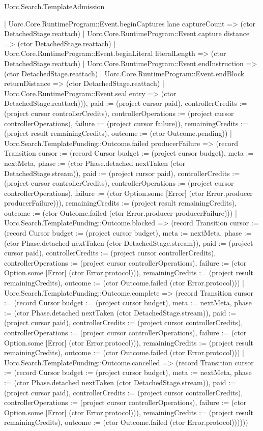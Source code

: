 \begin{lexlean}{Uorc.Search.TemplateAdmission}
\begin{semanticmodule}
{{{      | Uorc.Core.RuntimeProgram::Event.beginCaptures lane captureCount => (ctor DetachedStage.reattach)
      | Uorc.Core.RuntimeProgram::Event.capture distance => (ctor DetachedStage.reattach)
      | Uorc.Core.RuntimeProgram::Event.beginLiteral literalLength => (ctor DetachedStage.reattach)
      | Uorc.Core.RuntimeProgram::Event.endInstruction => (ctor DetachedStage.reattach)
      | Uorc.Core.RuntimeProgram::Event.endBlock returnDistance => (ctor DetachedStage.reattach)
      | Uorc.Core.RuntimeProgram::Event.seal entry => (ctor DetachedStage.reattach))), paid := (project cursor paid), controllerCredits := (project cursor controllerCredits), controllerOperations := (project cursor controllerOperations), failure := (project cursor failure)}), remainingCredits := (project result remainingCredits), outcome := (ctor Outcome.pending)})
    | Uorc.Search.TemplateFunding::Outcome.failed producerFailure => (record Transition {cursor := (record Cursor {budget := (project cursor budget), meta := nextMeta, phase := (ctor Phase.detached nextTaken (ctor DetachedStage.stream)), paid := (project cursor paid), controllerCredits := (project cursor controllerCredits), controllerOperations := (project cursor controllerOperations), failure := (ctor Option.some [Error] (ctor Error.producer producerFailure))}), remainingCredits := (project result remainingCredits), outcome := (ctor Outcome.failed (ctor Error.producer producerFailure))})
    | Uorc.Search.TemplateFunding::Outcome.blocked => (record Transition {cursor := (record Cursor {budget := (project cursor budget), meta := nextMeta, phase := (ctor Phase.detached nextTaken (ctor DetachedStage.stream)), paid := (project cursor paid), controllerCredits := (project cursor controllerCredits), controllerOperations := (project cursor controllerOperations), failure := (ctor Option.some [Error] (ctor Error.protocol))}), remainingCredits := (project result remainingCredits), outcome := (ctor Outcome.failed (ctor Error.protocol))})
    | Uorc.Search.TemplateFunding::Outcome.complete => (record Transition {cursor := (record Cursor {budget := (project cursor budget), meta := nextMeta, phase := (ctor Phase.detached nextTaken (ctor DetachedStage.stream)), paid := (project cursor paid), controllerCredits := (project cursor controllerCredits), controllerOperations := (project cursor controllerOperations), failure := (ctor Option.some [Error] (ctor Error.protocol))}), remainingCredits := (project result remainingCredits), outcome := (ctor Outcome.failed (ctor Error.protocol))})
    | Uorc.Search.TemplateFunding::Outcome.cancelled => (record Transition {cursor := (record Cursor {budget := (project cursor budget), meta := nextMeta, phase := (ctor Phase.detached nextTaken (ctor DetachedStage.stream)), paid := (project cursor paid), controllerCredits := (project cursor controllerCredits), controllerOperations := (project cursor controllerOperations), failure := (ctor Option.some [Error] (ctor Error.protocol))}), remainingCredits := (project result remainingCredits), outcome := (ctor Outcome.failed (ctor Error.protocol))}))))
}


\end{semanticmodule}
\end{lexlean}
